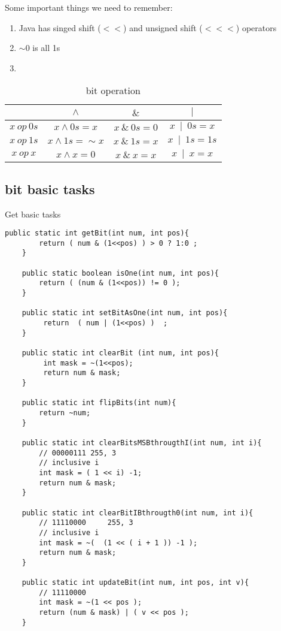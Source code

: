 Some important things we need to remember:
\begin{enumerate}
    \item   Java has singed shift (${<<}$) and unsigned shift  (${<<<}$) operators

    \item   ${\sim0}$ is all 1s 

    \item

\end{enumerate}

\begin{table}[ht]
\caption{  bit operation } %
\centering %
\begin{tabular}{ | c | c | c | c  |  }
\hline
                         &  ${ \wedge  }$             &  ${ \&   }$       &  ${ \mid  }$       \\
 \hline
        ${x ~ op ~ 0s  }$    & ${x \wedge 0s =x}$         &  ${x~\&~0s =0}$   &  ${x~\mid~0s = x }$       \\
 \hline
        ${x ~ op ~ 1s  }$    & ${x \wedge 1s = \sim x}$   &  ${x~\&~1s =x}$   &  ${x~\mid~1s = 1s}$        \\
 \hline
        ${x ~ op  ~x  }$     & ${x \wedge x =0 }$         &  ${x~\&~x = x}$   &   ${x~\mid~x = x}$     \\
 \hline
        

\end{tabular}
\label{tab:bit_opt} %

\end{table}

\subsection{  bit basic tasks  } 

Get basic tasks
\begin{lstlisting} 
public static int getBit(int num, int pos){
		return ( num & (1<<pos) ) > 0 ? 1:0 ;
	}
	
	public static boolean isOne(int num, int pos){
		return ( (num & (1<<pos)) != 0 );
	}
	
	public static int setBitAsOne(int num, int pos){
		 return  ( num | (1<<pos) )  ;
	}
	
	public static int clearBit (int num, int pos){
		 int mask = ~(1<<pos);
		 return num & mask;
	}
	
	public static int flipBits(int num){
		return ~num;
	}
	
	public static int clearBitsMSBthrougthI(int num, int i){
		// 00000111 255, 3
		// inclusive i
		int mask = ( 1 << i) -1;
		return num & mask;
	}
	
	public static int clearBitIBthrougth0(int num, int i){
		// 11110000     255, 3
		// inclusive i
		int mask = ~(  (1 << ( i + 1 )) -1 );
		return num & mask;
	}
	
	public static int updateBit(int num, int pos, int v){
		// 11110000
		int mask = ~(1 << pos );
		return (num & mask) | ( v << pos );
	}
\end{lstlisting}

